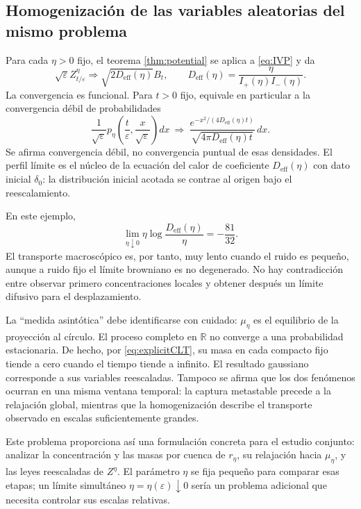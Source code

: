 \documentclass[11pt,a4paper]{article}
\theoremstyle{remark}\newtheorem{remark}{Observación}
\newcommand{\R}{\mathbb R}
\newcommand{\Deff}{D_{\mathrm{eff}}}
\begin{document}
\subsection{Homogenización de las variables aleatorias del mismo problema}
Para cada $\eta>0$ fijo, el teorema \ref{thm:potential} se aplica a \eqref{eq:IVP} y da
\begin{equation}\label{eq:explicitCLT}
 \sqrt\varepsilon Z_{t/\varepsilon}^\eta
 \Longrightarrow\sqrt{2\Deff(\eta)}B_t,
 \qquad\Deff(\eta)=\frac{\eta}{I_+(\eta)I_-(\eta)}.
\end{equation}
La convergencia es funcional. Para $t>0$ fijo, equivale en particular a la convergencia débil de probabilidades
\[
 \frac1{\sqrt\varepsilon}
 p_\eta\left(\frac{t}{\varepsilon},\frac{x}{\sqrt\varepsilon}\right)dx
 \ \Longrightarrow\
 \frac{e^{-x^2/(4\Deff(\eta)t)}}{\sqrt{4\pi\Deff(\eta)t}}\,dx.
\]
Se afirma convergencia débil, no convergencia puntual de esas densidades. El perfil límite es el núcleo de la ecuación del calor de coeficiente $\Deff(\eta)$ con dato inicial $\delta_0$: la distribución inicial acotada se contrae al origen bajo el reescalamiento.

En este ejemplo,
\[
 \lim_{\eta\downarrow0}\eta\log\frac{\Deff(\eta)}{\eta}
 =-\frac{81}{32}.
\]
El transporte macroscópico es, por tanto, muy lento cuando el ruido es pequeño, aunque a ruido fijo el límite browniano es no degenerado. No hay contradicción entre observar primero concentraciones locales y obtener después un límite difusivo para el desplazamiento.

La ``medida asintótica'' debe identificarse con cuidado: $\mu_\eta$ es el equilibrio de la proyección al círculo. El proceso completo en $\R$ no converge a una probabilidad estacionaria. De hecho, por \eqref{eq:explicitCLT}, su masa en cada compacto fijo tiende a cero cuando el tiempo tiende a infinito. El resultado gaussiano corresponde a sus variables reescaladas. Tampoco se afirma que los dos fenómenos ocurran en una misma ventana temporal: la captura metastable precede a la relajación global, mientras que la homogenización describe el transporte observado en escalas suficientemente grandes.

Este problema proporciona así una formulación concreta para el estudio conjunto: analizar la concentración y las masas por cuenca de $r_\eta$, su relajación hacia $\mu_\eta$, y las leyes reescaladas de $Z^\eta$. El parámetro $\eta$ se fija pequeño para comparar esas etapas; un límite simultáneo $\eta=\eta(\varepsilon)\downarrow0$ sería un problema adicional que necesita controlar sus escalas relativas.
\end{document}
